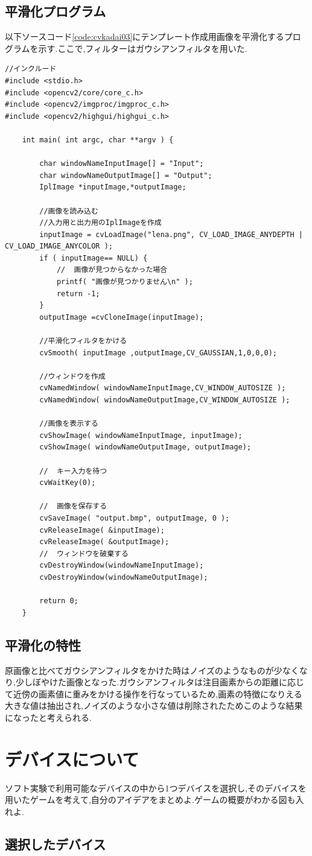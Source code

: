 \documentclass{jarticle}
\begin{document}
\subsection{平滑化プログラム}
以下ソースコード\ref{code:cvkadai03}にテンプレート作成用画像を平滑化するプログラムを示す.ここで,フィルターはガウシアンフィルタを用いた.
\begin{lstlisting}[caption = 動画に対するテンプレートマッチング,label=code:cvkadai02]
	//インクルード
#include <stdio.h>
#include <opencv2/core/core_c.h>
#include <opencv2/imgproc/imgproc_c.h>
#include <opencv2/highgui/highgui_c.h>

	int main( int argc, char **argv ) {

		char windowNameInputImage[] = "Input";
		char windowNameOutputImage[] = "Output";
		IplImage *inputImage,*outputImage;

		//画像を読み込む
		//入力用と出力用のIplImageを作成
		inputImage = cvLoadImage("lena.png", CV_LOAD_IMAGE_ANYDEPTH | CV_LOAD_IMAGE_ANYCOLOR );
		if ( inputImage== NULL) {
			//	画像が見つからなかった場合
			printf( "画像が見つかりません\n" );
			return -1;
		}
		outputImage =cvCloneImage(inputImage);

		//平滑化フィルタをかける 
		cvSmooth( inputImage ,outputImage,CV_GAUSSIAN,1,0,0,0);

		//ウィンドウを作成
		cvNamedWindow( windowNameInputImage,CV_WINDOW_AUTOSIZE );
		cvNamedWindow( windowNameOutputImage,CV_WINDOW_AUTOSIZE );

		//画像を表示する
		cvShowImage( windowNameInputImage, inputImage);
		cvShowImage( windowNameOutputImage, outputImage);

		//	キー入力を待つ
		cvWaitKey(0);

		//	画像を保存する
		cvSaveImage( "output.bmp", outputImage, 0 );
		cvReleaseImage( &inputImage);
		cvReleaseImage( &outputImage);
		//	ウィンドウを破棄する
		cvDestroyWindow(windowNameInputImage);
		cvDestroyWindow(windowNameOutputImage);

		return 0;
	}
\end{lstlisting}

\subsection{平滑化の特性}
原画像と比べてガウシアンフィルタをかけた時はノイズのようなものが少なくなり,少しぼやけた画像となった.ガウシアンフィルタは注目画素からの距離に応じて近傍の画素値に重みをかける操作を行なっているため,画素の特徴になりえる大きな値は抽出され,ノイズのような小さな値は削除されたためこのような結果になったと考えられる.
\section{デバイスについて}
ソフト実験で利用可能なデバイスの中から1つデバイスを選択し,そのデバイスを用いたゲームを考えて,自分のアイデアをまとめよ.ゲームの概要がわかる図も入れよ.

\subsection{選択したデバイス}
\end{document}
